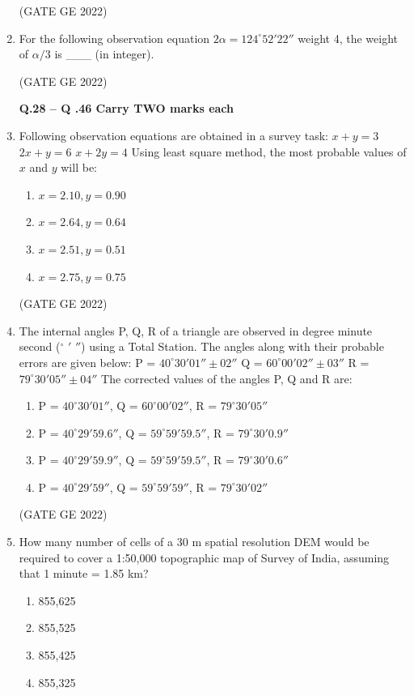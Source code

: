 \documentclass[journal,12pt,onecolumn]{IEEEtran}
\theoremstyle{remark}
\begin{document}
\begin{enumerate}
\hfill (GATE GE 2022)

\item For the following observation equation $2\alpha = 124^\circ 52' 22''$ weight 4, the weight of $\alpha / 3$ is \_\_\_ (in integer).

\hfill (GATE GE 2022)

\textbf{Q.28 – Q .46 Carry TWO marks each}

\item Following observation equations are obtained in a survey task:  
$x + y = 3$  
$2x + y = 6$  
$x + 2y = 4$  
Using least square method, the most probable values of $x$ and $y$ will be:
\begin{enumerate}
    \item $x = 2.10, y = 0.90$
    \item $x = 2.64, y = 0.64$
    \item $x = 2.51, y = 0.51$
    \item $x = 2.75, y = 0.75$
\end{enumerate}

\hfill (GATE GE 2022)

\item The internal angles P, Q, R of a triangle are observed in degree minute second ($^\circ$ $'$ $''$) using a Total Station. The angles along with their probable errors are given below:  
P = $40^\circ 30' 01'' \pm 02''$  
Q = $60^\circ 00' 02'' \pm 03''$  
R = $79^\circ 30' 05'' \pm 04''$  
The corrected values of the angles P, Q and R are:
\begin{enumerate}
    \item P = $40^\circ 30' 01''$, Q = $60^\circ 00' 02''$, R = $79^\circ 30' 05''$
    \item P = $40^\circ 29' 59.6''$, Q = $59^\circ 59' 59.5''$, R = $79^\circ 30' 0.9''$
    \item P = $40^\circ 29' 59.9''$, Q = $59^\circ 59' 59.5''$, R = $79^\circ 30' 0.6''$
    \item P = $40^\circ 29' 59''$, Q = $59^\circ 59' 59''$, R = $79^\circ 30' 02''$
\end{enumerate}

\hfill (GATE GE 2022)

\item How many number of cells of a 30 m spatial resolution DEM would be required to cover a 1:50,000 topographic map of Survey of India, assuming that 1 minute = 1.85 km?
\begin{enumerate}
    \item 855,625
    \item 855,525
    \item 855,425
    \item 855,325
\end{enumerate}


\end{enumerate}
\end{document}
